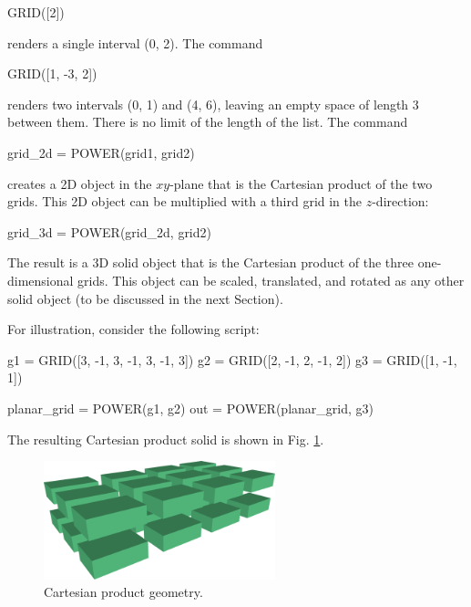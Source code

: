 \begin{bluecode}
GRID([2])
\end{bluecode}
renders a single interval (0, 2). The command

\begin{bluecode}
GRID([1, -3, 2])
\end{bluecode}
renders two intervals (0, 1) and (4, 6), leaving an empty 
space of length 3 between them. There is no limit of the 
length of the list.
The command  

\begin{bluecode}
grid_2d = POWER(grid1, grid2)
\end{bluecode}
creates a 2D object in the $xy$-plane that is the Cartesian 
product of the two grids. This 2D object can be multiplied 
with a third grid in the $z$-direction:

\begin{bluecode}
grid_3d = POWER(grid_2d, grid2)
\end{bluecode}
The result is a 3D solid object that is the Cartesian product 
of the three one-dimensional grids. This object can be scaled, 
translated, and rotated as any other solid object (to be discussed
in the next Section).

For illustration, consider the following script:

\begin{bluecode}
g1 = GRID([3, -1, 3, -1, 3, -1, 3])
g2 = GRID([2, -1, 2, -1, 2])
g3 = GRID([1, -1, 1])

planar_grid = POWER(g1, g2)
out = POWER(planar_grid, g3)
\end{bluecode}
The resulting Cartesian product solid is shown in Fig. \ref{fig:grid1}.\\

\begin{figure}[!ht]
\begin{center}
\includegraphics[width=0.6\textwidth]{img/grid1.png}
\end{center}
\vspace{-4mm}
\caption{Cartesian product geometry.}
\label{fig:grid1}
\end{figure}
\noindent
 


